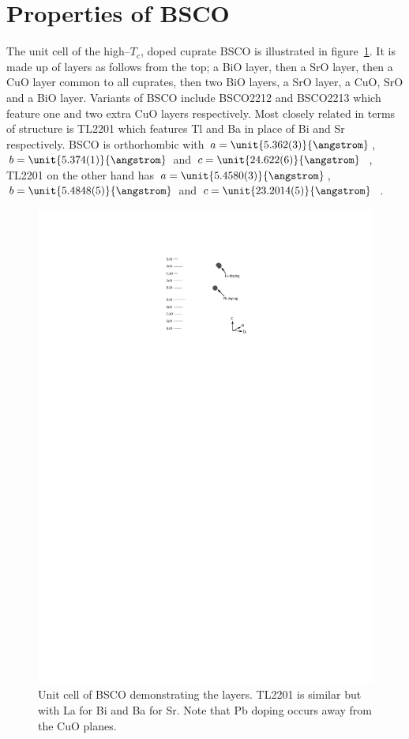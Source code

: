 
\section{Properties of \acs{BSCO}}
\label{Sec:Intro:PropertiesBSCO}

The unit cell of the high--$T_c$, doped cuprate \acf{BSCO} is illustrated in figure~\ref{Fig:Intro:BSCOUnitCell}. It is made up of layers as follows from the top; a BiO layer, then a SrO layer, then a CuO layer common to all cuprates, then two BiO layers, a SrO layer, a CuO, SrO and a BiO layer. Variants of \acs{BSCO} include \ac{BSCO2212} and \ac{BSCO2213} which feature one and two extra CuO layers respectively. Most closely related in terms of structure is \acs{TL2201} which features Tl and Ba in place of Bi and Sr respectively. \ac{BSCO} is orthorhombic with $a=\unit{5.362(3)}{\angstrom}$, $b=\unit{5.374(1)}{\angstrom}$ and $c=\unit{24.622(6)}{\angstrom}$~\cite{Torardi1988a}, \ac{TL2201} on the other hand has $a=\unit{5.4580(3)}{\angstrom}$, $b=\unit{5.4848(5)}{\angstrom}$ and $c=\unit{23.2014(5)}{\angstrom}$~\cite{Peets2007}.
\begin{figure}[htbp]
    \begin{center}
        \includegraphics[scale=1.1]{Chapter-Introduction/Figures/BSCOUnitCell/BSCOUnitCell}
        \caption{Unit cell of \acs{BSCO} demonstrating the layers. \ac{TL2201} is similar but with La for Bi and Ba for Sr. Note that Pb doping occurs away from the CuO planes.}
        \label{Fig:Intro:BSCOUnitCell}
    \end{center}
\end{figure}
